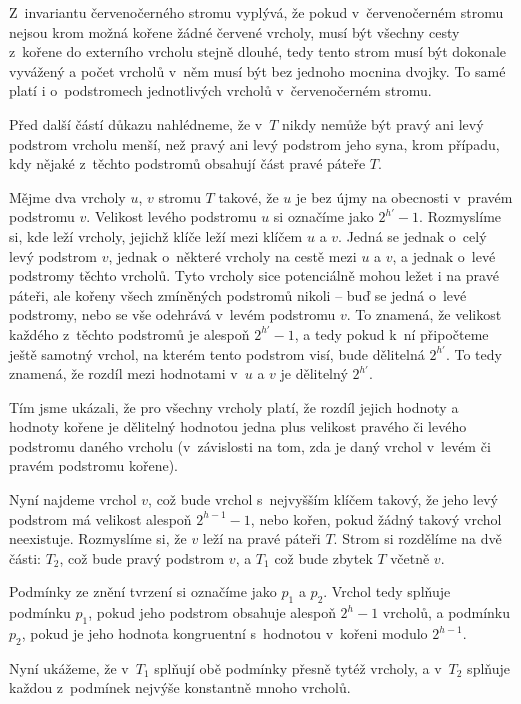 \begin{dukaz}
Z~invariantu červenočerného stromu vyplývá, že pokud v~červenočerném stromu nejsou krom možná kořene žádné červené vrcholy, musí být všechny cesty z~kořene do externího vrcholu stejně dlouhé, tedy tento strom musí být dokonale vyvážený a počet vrcholů v~něm musí být bez jednoho mocnina dvojky. To samé platí i o~podstromech jednotlivých vrcholů v~červenočerném stromu.

Před další částí důkazu nahlédneme, že v~$T$ nikdy nemůže být pravý ani levý podstrom vrcholu menší, než pravý ani levý podstrom jeho syna, krom případu, kdy nějaké z~těchto podstromů obsahují část pravé páteře $T$.

Mějme dva vrcholy $u$, $v$ stromu $T$ takové, že $u$ je bez újmy na obecnosti v~pravém
podstromu $v$. Velikost levého podstromu $u$ si označíme jako $2^{h'}-1$. Rozmyslíme si, kde leží vrcholy, jejichž klíče leží mezi klíčem
$u$ a $v$. Jedná se jednak o~celý levý podstrom $v$, jednak o~některé vrcholy
na cestě mezi $u$ a $v$, a jednak o~levé podstromy těchto vrcholů. Tyto vrcholy
sice potenciálně mohou ležet i na pravé páteři, ale kořeny všech zmíněných podstromů nikoli -- buď se jedná o~levé podstromy, nebo se vše odehrává v~levém podstromu $v$. To znamená, že velikost každého z~těchto podstromů je alespoň $2^{h'} - 1$, a tedy pokud k~ní připočteme ještě samotný vrchol, na kterém tento podstrom visí, bude dělitelná $2^{h'}$. To tedy znamená, že rozdíl mezi hodnotami v~$u$ a $v$ je dělitelný $2^{h'}$.

\begin{pozorovani}\label{poz:1}
Tím jsme ukázali, že pro všechny vrcholy platí, že rozdíl jejich hodnoty a hodnoty kořene je dělitelný hodnotou jedna plus velikost pravého či levého podstromu daného vrcholu (v~závislosti na tom, zda je daný vrchol v~levém či pravém podstromu kořene).
\end{pozorovani}

Nyní najdeme vrchol $v$, což bude vrchol s~nejvyšším klíčem takový, že jeho levý
podstrom má velikost alespoň $2^{h-1} -1$, nebo kořen, pokud žádný takový vrchol neexistuje. Rozmyslíme si, že $v$ leží na pravé páteři $T$. Strom si
rozdělíme na dvě části: $T_2$, což bude pravý podstrom $v$, a $T_1$ což bude zbytek $T$ včetně $v$.

Podmínky ze znění tvrzení si označíme jako $p_1$ a $p_2$. Vrchol tedy splňuje podmínku $p_1$, pokud jeho podstrom obsahuje alespoň $2^h-1$ vrcholů, a podmínku $p_2$, pokud je jeho hodnota kongruentní s~hodnotou v~kořeni modulo $2^{h-1}$.

Nyní ukážeme, že v~$T_1$ splňují obě podmínky přesně tytéž vrcholy, a v~$T_2$ splňuje každou z~podmínek nejvýše konstantně mnoho vrcholů.


\end{dukaz}
